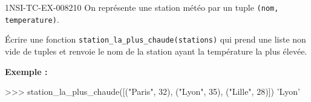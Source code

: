 \begin{exercice}{1NSI-TC-EX-008}{2}{10}
On représente une station météo par un tuple \lstinline{(nom, temperature)}.

Écrire une fonction \lstinline{station_la_plus_chaude(stations)} qui prend une liste
non vide de tuples et renvoie le nom de la station ayant la température la plus élevée.

\textbf{Exemple :}
\begin{console}
>>> station_la_plus_chaude([("Paris", 32), ("Lyon", 35), ("Lille", 28)])
'Lyon'
\end{console}
\end{exercice}
